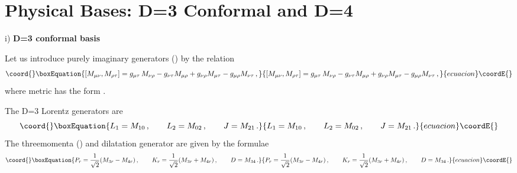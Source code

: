 \documentclass[a4paper,12pt,showkeys]{article}
\begin{document}
\section{Physical Bases:  D=3 Conformal and
 D=4 \coordHE{}}
\setcounter{equation}{0}

  i) {\bf D=3 conformal basis}

  Let us introduce purely imaginary \coordHE{} generators \coordHE{} (\coordHE{}) by the relation
  \begin{equation}\coord{}\boxEquation{\label{llm22.9}
  [M_{\mu\nu} , M_{\rho \tau} ] = g_{\mu\tau} \,
  M_{\nu\rho} - g_{\nu\tau} M_{\mu\rho} + g_{\nu\rho}
  M_{\mu\tau} - g_{\mu\rho} M_{\nu\tau} \, ,
  }{[M_{\mu\nu} , M_{\rho \tau} ] = g_{\mu\tau} \,
  M_{\nu\rho} - g_{\nu\tau} M_{\mu\rho} + g_{\nu\rho}
  M_{\mu\tau} - g_{\mu\rho} M_{\nu\tau} \, ,
  }{ecuacion}\coordE{}\end{equation}
  where \coordHE{} metric has the form          \coordHE{}.

  The D=3 Lorentz generators are
  \begin{equation}\coord{}\boxEquation{\label{llm22.10a}
  L_1 = M_{10} \, , \qquad
  L_2 = M_{02} \, , \qquad J=M_{21} \, .
}{L_1 = M_{10} \, , \qquad
  L_2 = M_{02} \, , \qquad J=M_{21} \, .
}{ecuacion}\coordE{}\end{equation}
The threemomenta \coordHE{} (\coordHE{}) and dilatation
 generator \coordHE{}
are given by the formulae
\begin{equation}\coord{}\boxEquation{\label{llm22.10b}
P_r = \frac{1}{\sqrt{2}} (M_{3r} - M_{4r} ) \, , \qquad K_r =
\frac{1}{\sqrt{2}} (M_{3r} + M_{4r} ) \, , \qquad D= M_{34} \, .
}{P_r = \frac{1}{\sqrt{2}} (M_{3r} - M_{4r} ) \, , \qquad K_r =
\frac{1}{\sqrt{2}} (M_{3r} + M_{4r} ) \, , \qquad D= M_{34} \, .
}{ecuacion}\coordE{}\end{equation}
\end{document}
